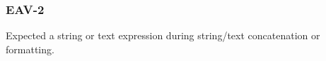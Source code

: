 \subsubsection{EAV-2}\label{sec:error_code_eav_2}

Expected a string or text expression during string/text concatenation or formatting.

